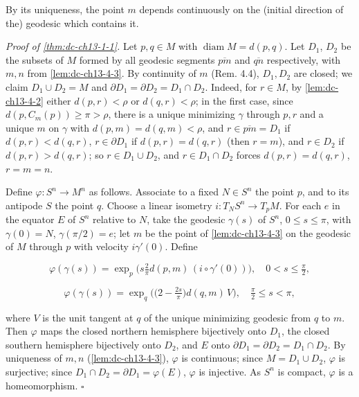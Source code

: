 \begin{remark}[Remark 4.4]
  \label{rem:dc-ch13-4-4}
  By its uniqueness, the point $m$ depends continuously on the (initial direction of
  the) geodesic which contains it.
  
  \emph{Proof of \cref{thm:dc-ch13-1-1}.} Let $p,q\in M$ with $\operatorname{diam}M=d(p,q)$. Let $D_1$,
  $D_2$ be the subsets of $M$ formed by all geodesic segments $\overline{pm}$ and
  $\overline{qn}$ respectively, with $m,n$ from \cref{lem:dc-ch13-4-3}. By continuity of $m$ (Rem.
  4.4), $D_1,D_2$ are closed; we claim $D_1\cup D_2=M$ and
  $\partial D_1=\partial D_2=D_1\cap D_2$. Indeed, for $r\in M$, by \cref{lem:dc-ch13-4-2} either
  $d(p,r)<\rho$ or $d(q,r)<\rho$; in the first case, since $d(p,C_m(p))\geq\pi>\rho$,
  there is a unique minimizing $\gamma$ through $p,r$ and a unique $m$ on $\gamma$ with
  $d(p,m)=d(q,m)<\rho$, and $r\in\overline{pm}=D_1$ if $d(p,r)<d(q,r)$, $r\in\partial D_1$
  if $d(p,r)=d(q,r)$ (then $r=m$), and $r\in D_2$ if $d(p,r)>d(q,r)$; so
  $r\in D_1\cup D_2$, and $r\in D_1\cap D_2$ forces $d(p,r)=d(q,r)$, $r=m=n$.
  
  Define $\varphi:S^n\to M^n$ as follows. Associate to a fixed $N\in S^n$ the point
  $p$, and to its antipode $S$ the point $q$. Choose a linear isometry
  $i:T_NS^n\to T_pM$. For each $e$ in the equator $E$ of $S^n$ relative to $N$, take
  the geodesic $\gamma(s)$ of $S^n$, $0\leq s\leq\pi$, with $\gamma(0)=N$,
  $\gamma(\pi/2)=e$; let $m$ be the point of \cref{lem:dc-ch13-4-3} on the geodesic of $M$ through
  $p$ with velocity $i\gamma'(0)$. Define
  
  $$
  \varphi(\gamma(s))=\exp_p\!\Big(s\tfrac{2}{\pi}d(p,m)\,(i\circ\gamma'(0))\Big),\quad 0<s\leq\tfrac{\pi}{2},
  $$
  
  $$
  \varphi(\gamma(s))=\exp_q\!\Big(\big(2-\tfrac{2s}{\pi}\big)d(q,m)\,V\Big),\quad\tfrac{\pi}{2}\leq s<\pi,
  $$
  
  where $V$ is the unit tangent at $q$ of the unique minimizing geodesic from $q$ to
  $m$. Then $\varphi$ maps the closed northern hemisphere bijectively onto $D_1$, the
  closed southern hemisphere bijectively onto $D_2$, and $E$ onto
  $\partial D_1=\partial D_2=D_1\cap D_2$. By uniqueness of $m,n$ (\cref{lem:dc-ch13-4-3}),
  $\varphi$ is continuous; since $M=D_1\cup D_2$, $\varphi$ is surjective; since
  $D_1\cap D_2=\partial D_1=\varphi(E)$, $\varphi$ is injective. As $S^n$ is compact,
  $\varphi$ is a homeomorphism. $\square$
\end{remark}

